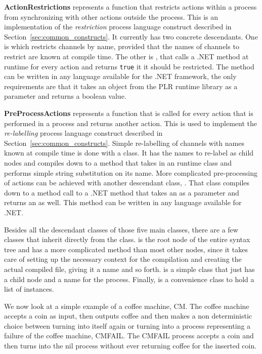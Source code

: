  	\textbf{ActionRestrictions} represents a function that restricts actions 
 	within a process from synchronizing with other actions outside the process. 
 	This is an implementation of the \textit{restriction} process language 
 	construct described in Section~\ref{sec:common_constructs}. It currently has 
 	two concrete descendants. One is  which 
 	restricts channels by name, provided that the names of channels to restrict 
 	are known at compile time. The other is , that 
 	calls a .NET method at runtime for every action and returns \texttt{true} it 
 	it should be restricted. The method can be written in any language available 
 	for the .NET framework, the only requirements are that it takes an 
 	 object from the PLR runtime library as a parameter and 
 	returns a boolean value.
	 
 	\textbf{PreProcessActions} represents a function that is called for every 
 	action that is performed in a process and returns another action. This is 
 	used to implement the \textit{re-labelling} process language construct 
 	described in Section~\ref{sec:common_constructs}. Simple re-labelling of 
 	channels with names known at compile time is done with a 
 	 class. It has the names to re-label as child nodes 
 	and compiles down to a method that takes in an  runtime class 
 	and performs simple string substitution on its name. More complicated 
 	pre-processing of actions can be achieved with another descendant class, 
 	. That class compiles down to a method call to a 
 	.NET method that takes an  as a parameter and returns an 
 	 as well. This method can be written in any language 
 	available for .NET.
 	
 	Besides all the descendant classes of those five main classes, there are a 
 	few classes that inherit directly from the  class. 
 	 is the root node of the entire syntax tree and has a 
 	more complicated  method than most other nodes, since it 
 	takes care of setting up the necessary context for the compilation and 
 	creating the actual compiled file, giving it a name and so forth. 
 	 is a simple class that just has a 
 	 child node and a name for the process. Finally, 
 	 is a convenience class to hold a list of 
 	 instances.
 	
	We now look at a simple example of a coffee machine, CM. The coffee machine 
	accepts a coin as input, then outputs coffee and then makes a non 
	deterministic choice between turning into itself again or turning into a 
	process representing a failure of the coffee machine, CMFAIL. The CMFAIL 
	process accepts a coin and then turns into the nil process without ever
	returning coffee for the inserted coin.

